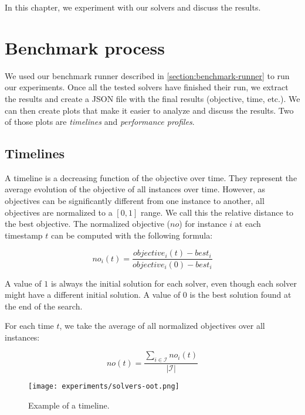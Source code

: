 \documentclass[../../thesis.tex]{subfiles}
\begin{document}
In this chapter, we experiment with our solvers and discuss the results. 

\section{Benchmark process}

We used our benchmark runner described in \autoref{section:benchmark-runner} to run our experiments.
Once all the tested solvers have finished their run, we extract the results and create a JSON file 
with the final results (objective, time, etc.). We can then create plots that make it 
easier to analyze and discuss the results. Two of those plots are \emph{timelines} and \emph{performance profiles}.

\subsection{Timelines}

A timeline is a decreasing function of the objective over time. 
They represent the average evolution of the objective of all instances over time.
However, as objectives can be 
significantly different from one instance to another, all objectives are normalized to a $[0, 1]$ range.
We call this the relative distance to the best objective. 
The normalized objective ($no$) for instance $i$ at each timestamp $t$ can 
be computed with the following formula:

\begin{equation*}
  no_i(t) = \frac{objective_i(t) - best_i}{objective_i(0) - best_i}
\end{equation*}

A value of $1$ is always the initial solution for each solver, even though each solver might have a different initial solution. 
A value of $0$ is the best solution found at the end of the search. 

For each time $t$, we take the average of all normalized objectives over all instances:


\begin{equation*}
   no(t) = \frac{\sum_{i \in \mathcal{I}} no_{i}(t)}{|\mathcal{I}|}
\end{equation*}



\begin{figure}
  \centering
  \texttt{[image: experiments/solvers-oot.png]}
  \caption{Example of a timeline.}
  \label{timeline-example}
\end{figure}
\end{document}

